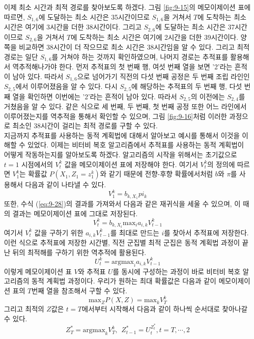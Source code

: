 \documentclass[a4paper]{oblivoir}
\begin{document}
이제 최소 시간과 최적 경로를 찾아보도록 하겠다. 그림 \ref{fig:9-15}의 메모이제이션 표에 따르면, $S_{1,6}$에 도달하는 최소 시간은 35시간이므로 $S_{1,6}$을 거쳐서 $T$에 도착하는 최소 시간은 여기에 3시간을 더한 38시간이다. 그리고 $S_{2,6}$에 도달하는 최소 시간은 37시간이므로 $S_{2,6}$을 거쳐서 $T$에 도착하는 최소 시간은 여기에 2시간을 더한 39시간이다. 양쪽을 비교하면 38시간이 더 작으므로 최소 시간은 38시간임을 알 수 있다. 그리고 최적 경로는 일단 $S_{1,6}$를 거쳐야 하는 것까지 확인하였으며, 나머지 경로는 추적표를 활용해서 역추적해나가야 한다. 먼저 추적표의 첫 번째 행, 여섯 번째 열을 보면 '2'라는 흔적이 남아 있다. 따라서 $S_{1,6}$으로 넘어가기 직전의 다섯 번째 공정은 두 번째 조립 라인인 $S_{2,5}$에서 이루어졌음을 알 수 있다. 다시 $S_{2,5}$에 해당하는 추적표의 두 번째 행, 다섯 번째 열을 확인하면 이번에는 '2'라는 흔적이 남아 있다. 따라서 $S_{2,5}$의 이전에는 $S_{2,4}$를 거쳤음을 알 수 있다. 같은 식으로 세 번째, 두 번째, 첫 번째 공정 또한 어느 라인에서 이루어졌는지를 역추적을 통해서 확인할 수 있으며, 그림 \ref{fig:9-16}처럼 이러한 과정으로 최소인 38시간이 걸리는 최적 경로를 구할 수 있다. \\

지금까지 추적표를 사용하는 동적 계획법에 대해서 알아보고 예시를 통해서 이것을 이해할 수 있었다. 이제는 비터비 복호 알고리즘에서 추적표를 사용하는 동적 계획법이 어떻게 작동하는지를 알아보도록 하겠다. 알고리즘의 시작을 위해서는 초기값으로 $t=1$ 시점에서의 $V_{t}^{k}$ 값을 메모이제이션 표에 저장해야 한다. 여기서 $V_{t}^{k}$의 정의에 따르면 $V_{1}^{k}$는 확률값 $P(X_1, Z_1=z_{1}^{k})$와 같기 때문에 전향-후향 확률에서처럼 $b$와 $\pi$를 사용해서 다음과 같이 나타낼 수 있다. 
\begin{equation}
V_{1}^{k} = b_{k,X_1} pi_{k}
\label{eq:9-29}
\end{equation}
또한, 수식 (\ref{eq:9-28})의 결과를 가져와서 다음과 같은 재귀식을 세울 수 있으며, 이 때의 결과는 메모이제이션 표에 그대로 저장된다. 
\begin{equation}
V_{t}^{k} = b_{k,X_{t}} \textrm{max}_{i} a_{i,k} V_{t-1}^{k}
\label{eq:9-30}
\end{equation}
여기서 $V_{t}^{k}$ 값을 구하기 위한 $a_{i,k} V_{t-1}^{k}$를 최대로 만드는 $i$를 찾아서 추적표에 저장한다. 이런 식으로 추적표에 저장한 시간별, 직전 군집별 최적 군집은 동적 계획법 과정이 끝난 뒤의 최적해를 구하기 위한 역추적에 활용된다. 
\begin{equation}
U_{t}^{k} = \textrm{argmax}_{i} a_{i,k} V_{t-1}^{k}
\label{eq:9-31}
\end{equation}
이렇게 메모이제이션 표 $V$와 추적표 $U$를 동시에 구성하는 과정이 바로 비터비 복호 알고리즘의 동적 계획법 과정이다. 우리가 원하는 최대 확률값은 다음과 같이 메모이제이션 표의 $T$번째 열을 참조해서 구할 수 있다. 
\begin{equation}
\textrm{max}_{Z} P(X,Z) = \textrm{max}_{k} V_{T}^{k}
\label{eq:9-32}
\end{equation}
그리고 최적의 $Z$값은 $t=T$에서부터 시작해서 다음과 같이 하나씩 순서대로 찾아나갈 수 있다. 
\begin{equation}
Z_{T}^{*} = \textrm{argmax}_{k} V_{T}^{k}, \ \ Z_{t-1}^{*} = U_{t}^{Z_{t}^{*}}, t=T,\cdots,2
\label{eq:9-33}
\end{equation} 
\end{document}
